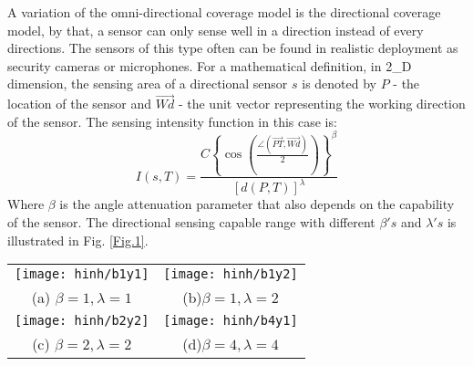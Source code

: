 \documentclass[final]{elsarticle}
\begin{document}
A variation of the omni-directional coverage model is the directional coverage model, by that, a sensor can only sense well in a direction instead of every directions. The sensors of this type often can be found in realistic deployment as security cameras or microphones.  For a mathematical definition, in 2\_D dimension, the sensing area of a directional sensor $ s $ is denoted by $ P $ - the location of the sensor and $ \overrightarrow{Wd}$ - the unit vector representing the working direction of the sensor. The sensing intensity function in this case is:
\begin{equation}
\label{eqfd}
I({s},T) = \frac{{C{{\left\{ {\cos \left( {\frac{{\angle (\overrightarrow {PT} ,\overrightarrow {Wd}) }}{2}} \right)} \right\}}^\beta }}}{{{{\left[ {d(P,T)} \right]}^\lambda }}}
\end{equation}
Where $\beta$ is the angle attenuation parameter that also depends on the capability of the sensor. The directional sensing capable range with different $ \beta's $ and $ \lambda's $ is illustrated in Fig. \ref{Fig.1}. \\
\begin{figure*}[h]
	\begin{tabular}{cc}
		\texttt{[image: hinh/b1y1]}&\texttt{[image: hinh/b1y2]}\\
		(a) $\beta =1, \lambda=1 $ &(b)$ \beta=1, \lambda=2 $\\
		\texttt{[image: hinh/b2y2]}&\texttt{[image: hinh/b4y1]}\\
		(c) $ \beta=2, \lambda=2 $& (d)$ \beta=4, \lambda=4 $\\
	\end{tabular}
	\centering
	\caption{Illustration attenuated directional sensing model with different $ \beta's $ and $ \lambda's $
	}
	\label{Fig.1}       %
\end{figure*}
\end{document}
